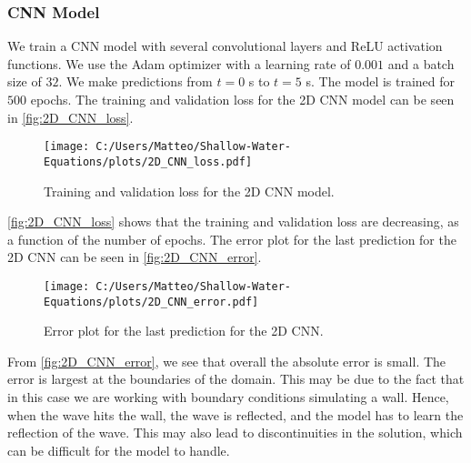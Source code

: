 \subsubsection*{CNN Model}
We train a CNN model with several convolutional layers and ReLU activation functions.
We use the Adam optimizer with a learning rate of $0.001$ and a batch size of $32$.
We make predictions from $t = 0$ s to $t = 5$ s.
The model is trained for $500$ epochs.
The training and validation loss for the 2D CNN model can be seen in \autoref{fig:2D_CNN_loss}.
\begin{figure}[H]
    \centering
    \texttt{[image: C:/Users/Matteo/Shallow-Water-Equations/plots/2D\_CNN\_loss.pdf]}
    \caption{Training and validation loss for the 2D CNN model.}\label{fig:2D_CNN_loss}
\end{figure}
\autoref{fig:2D_CNN_loss} shows that the training and validation loss are decreasing, as a function of the number of epochs.
The error plot for the last prediction for the 2D CNN can be seen in \autoref{fig:2D_CNN_error}.
\begin{figure}[H]
    \centering
    \texttt{[image: C:/Users/Matteo/Shallow-Water-Equations/plots/2D\_CNN\_error.pdf]}
    \caption{Error plot for the last prediction for the 2D CNN.}\label{fig:2D_CNN_error}
\end{figure}
From \autoref{fig:2D_CNN_error}, we see that overall the absolute error is small.
The error is largest at the boundaries of the domain. 
This may be due to the fact that in this case we are working with boundary conditions simulating a wall.
Hence, when the wave hits the wall, the wave is reflected, and the model has to learn the reflection of the wave.
This may also lead to discontinuities in the solution, which can be difficult for the model to handle.

